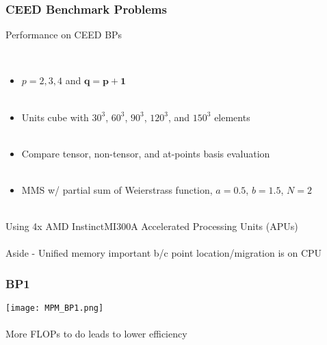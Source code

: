 \documentclass{beamer}
\begin{document}
\begin{frame}
\begin{center}
\frametitle{CEED Benchmark Problems}

Performance on CEED BPs

~\\

\begin{itemize}

\item $p = 2, 3, 4$ and $\pmb{q = p + 1}$\\

~\\

\item Units cube with $30^3$, $60^3$, $90^3$, $120^3$, and $150^3$ elements\\

~\\

\item Compare tensor, non-tensor, and at-points basis evaluation\\

~\\

\item MMS w/ partial sum of Weierstrass function, $a = 0.5$, $b = 1.5$, $N = 2$\\

\end{itemize}

~\\

Using 4x AMD Instinct\texttrademark MI300A Accelerated Processing Units (APUs)\\

~\\

Aside - Unified memory important b/c point location/migration is on CPU

\end{center}
\end{frame}


\begin{frame}
\begin{center}
\frametitle{BP1}

\texttt{[image: MPM\_BP1.png]}\\

~\\

More FLOPs to do leads to lower efficiency

\end{center}
\end{frame}
\end{document}
